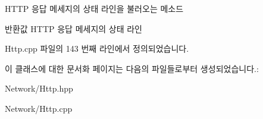 H\+T\+TP 응답 메세지의 상태 라인을 불러오는 메소드 

\begin{DoxyReturn}{반환값}
H\+T\+TP 응답 메세지의 상태 라인 
\end{DoxyReturn}


Http.\+cpp 파일의 143 번째 라인에서 정의되었습니다.



이 클래스에 대한 문서화 페이지는 다음의 파일들로부터 생성되었습니다.\+:\begin{DoxyCompactItemize}
\item 
Network/Http.\+hpp\item 
Network/Http.\+cpp\end{DoxyCompactItemize}
